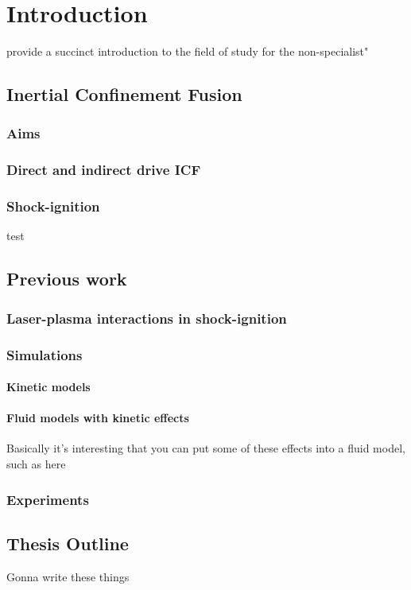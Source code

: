 \chapter{Introduction}
\label{chp:introduction}
provide a succinct introduction to the field of study for the non-specialist"

\section{Inertial Confinement Fusion}
\subsection{Aims}
\subsection{Direct and indirect drive ICF}
\subsection{Shock-ignition}
test\cite{Rib2009}


\section{Previous work}
\subsection{Laser-plasma interactions in shock-ignition}
\subsection{Simulations}
\subsubsection{Kinetic models}
\subsubsection{Fluid models with kinetic effects}
Basically it's interesting that you can put some of these effects into a fluid model, such as here \cite{Tran2020}
\subsection{Experiments}

\section{Thesis Outline}
Gonna write these things



